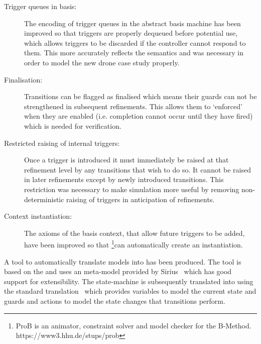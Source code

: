 \begin{description}
\item[Trigger queues in basis:]
  \begin{sloppypar}
    The encoding of trigger queues in the abstract basis machine has been improved so that triggers are properly dequeued before potential use,
    which allows triggers to be discarded if the controller cannot respond to them. 
    This more accurately reflects the \SCXML semantics and was necessary in order to model the new drone case study properly.
  \end{sloppypar}

\item[Finalisation:] Transitions can be flagged as finalised which means their guards can not be strengthened in subsequent refinements. This allows them to `enforced' when they are enabled (i.e. completion cannot occur until they have fired) which is needed for verification. 

\item[Restricted raising of internal triggers:] Once a trigger is introduced it must immediately be raised at that refinement level by any transitions that wish to do so. It cannot be raised in later refinements except by newly introduced transitions. This restriction was necessary to make simulation more useful by removing non-deterministic raising of triggers in anticipation of refinements.

\item[Context instantiation:] The axioms of the basis context, that allow future triggers to be added, have been improved so that \PROB\footnote{ProB is an animator, constraint solver and model checker for the B-Method. https://www3.hhu.de/stups/prob}can automatically create an instantiation. 

\end{description}

A tool to automatically translate \SCXML models into \UMLB has been produced. 
The tool is based on the \EMF and uses an \SCXML meta-model provided by Sirius~\cite{siriuswebsite} which has good support for extensibility. 
The \UMLB state-machine is subsequently translated into \EVENTB using the standard \UMLB translation~\cite{snook14:iumlbStatem} which provides variables to model the current state and guards and actions to model the state changes that transitions perform.

